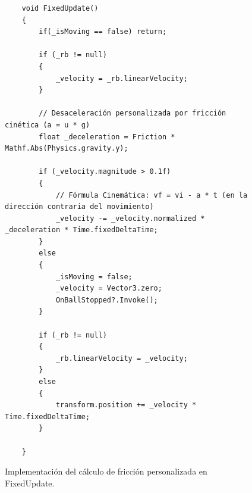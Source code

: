 \documentclass[11pt,letterpaper,twocolumn]{article}
\begin{document}
\clearpage
\onecolumn
\begin{figure}[H]
    \centering
    \begin{BVerbatim}
    void FixedUpdate()
    {
        if(_isMoving == false) return;

        if (_rb != null)
        {
            _velocity = _rb.linearVelocity;
        }

        // Desaceleración personalizada por fricción cinética (a = u * g)
        float _deceleration = Friction * Mathf.Abs(Physics.gravity.y);

        if (_velocity.magnitude > 0.1f)
        {
            // Fórmula Cinemática: vf = vi - a * t (en la dirección contraria del movimiento)
            _velocity -= _velocity.normalized * _deceleration * Time.fixedDeltaTime;
        }
        else
        {
            _isMoving = false;
            _velocity = Vector3.zero;
            OnBallStopped?.Invoke();
        }

        if (_rb != null)
        {
            _rb.linearVelocity = _velocity;
        }
        else
        {
            transform.position += _velocity * Time.fixedDeltaTime;
        }

    }
    \end{BVerbatim}
    \caption{Implementación del cálculo de fricción personalizada en FixedUpdate.}
    \label{fig:fixedupdate-physics}
\end{figure}
\end{document}
